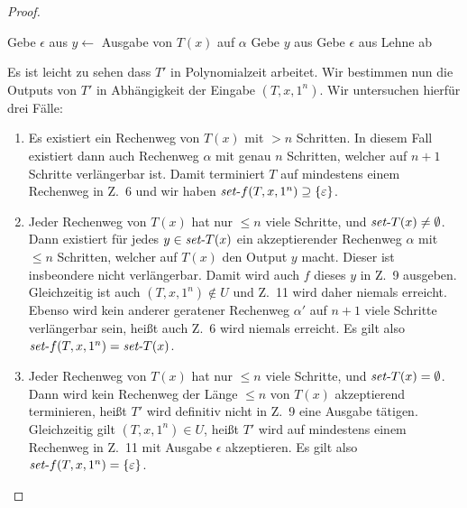 \begin{proof}
    \begin{algorithm}[H]\setcounter{AlgoLine}{4}
        {
            Gebe $\epsilon$ aus\;
        }
        {
            $y\gets $ Ausgabe von $T(x)$ auf $\alpha$\;
            Gebe $y$ aus\;
        }
        {
            Gebe $\epsilon$ aus\;
        }
        \Else
        {
            Lehne ab\;
        }
    \end{algorithm}
    Es ist leicht zu sehen dass $T'$ in Polynomialzeit arbeitet. 
    Wir bestimmen nun die Outputs von $T'$  in Abhängigkeit der Eingabe $(T, x, 1^n)$.
    Wir untersuchen hierfür drei Fälle:
    \begin{enumerate}[label=\arabic*.]
        \item Es existiert ein Rechenweg von $T(x)$ mit $>n$ Schritten. In diesem Fall existiert dann auch Rechenweg $\alpha$ mit genau $n$ Schritten, welcher auf $n+1$ Schritte verlängerbar ist. Damit terminiert $T$ auf mindestens einem Rechenweg in Z.~6 und wir haben $\mathit{set}\text{-}{f}(T, x, 1^n)\supseteq\{\varepsilon\}$.
        \item Jeder Rechenweg von $T(x)$ hat nur $\leq n$ viele Schritte, und $\mathit{set}\text{-}{T}(x)\neq\emptyset$. Dann existiert für jedes $y\in \mathit{set}\text{-}{T}(x)$ ein akzeptierender Rechenweg $\alpha$ mit $\leq n$ Schritten, welcher auf $T(x)$ den Output $y$ macht. Dieser ist insbeondere nicht verlängerbar. Damit wird auch $f$ dieses $y$ in Z.~9 ausgeben.
            Gleichzeitig ist auch $(T, x, 1^n)\not\in U$ und Z.~11 wird daher niemals erreicht.
            Ebenso wird kein anderer geratener Rechenweg $\alpha'$ auf $n+1$ viele Schritte verlängerbar sein, heißt auch Z.~6 wird niemals erreicht.
            Es gilt also $\mathit{set}\text{-}{f}(T, x, 1^n)=\mathit{set}\text{-}{T}(x)$.
    \item Jeder Rechenweg von $T(x)$ hat nur $\leq n$ viele Schritte, und $\mathit{set}\text{-}{T}(x)=\emptyset$. 
        Dann wird kein Rechenweg der Länge $\leq n$ von $T(x)$ akzeptierend terminieren, heißt $T'$ wird definitiv nicht in Z.~9 eine Ausgabe tätigen.
        Gleichzeitig gilt $(T, x, 1^n)\in U$, heißt $T'$ wird auf mindestens einem Rechenweg in Z.~11 mit Ausgabe $\epsilon$ akzeptieren.
        Es gilt also $\mathit{set}\text{-}{f}(T, x, 1^n)=\{\varepsilon\}$.
    \end{enumerate}


\end{proof}
